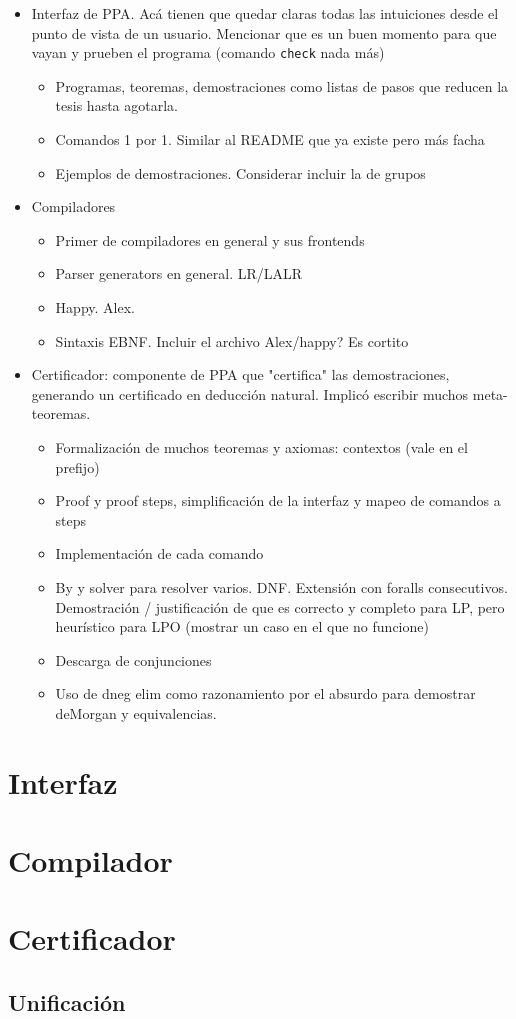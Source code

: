 \begin{itemize}
    \item Interfaz de PPA. Acá tienen que quedar claras todas las intuiciones
    desde el punto de vista de un usuario. Mencionar que es un buen momento para
    que vayan y prueben el programa (comando \texttt{check} nada más)
    \begin{itemize}
        \item Programas, teoremas, demostraciones como listas de pasos que
        reducen la tesis hasta agotarla.
        \item Comandos 1 por 1. Similar al README que ya existe pero más facha
        \item Ejemplos de demostraciones. Considerar incluir la de grupos
    \end{itemize}
    \item Compiladores
    \begin{itemize}
        \item Primer de compiladores en general y sus frontends
        \item Parser generators en general. LR/LALR
        \item Happy. Alex.
        \item Sintaxis EBNF. Incluir el archivo Alex/happy? Es cortito
    \end{itemize}
    \item Certificador: componente de PPA que "certifica" las demostraciones,
    generando un certificado en deducción natural. Implicó escribir muchos
    meta-teoremas.
    \begin{itemize}
        \item Formalización de muchos teoremas y axiomas: contextos (vale en el prefijo)
        \item Proof y proof steps, simplificación de la interfaz y mapeo de
        comandos a steps
        \item Implementación de cada comando
        \item By y solver para resolver varios. DNF. Extensión con foralls
        consecutivos. Demostración / justificación de que es correcto y completo
        para LP, pero heurístico para LPO (mostrar un caso en el que no funcione)
        \item Descarga de conjunciones
        \item Uso de dneg elim como razonamiento por el absurdo para demostrar
        deMorgan y equivalencias.
    \end{itemize}
\end{itemize}

\section{Interfaz}

\section{Compilador}

\section{Certificador}

\subsection{Unificación}
\label{ppa:sec:unification}